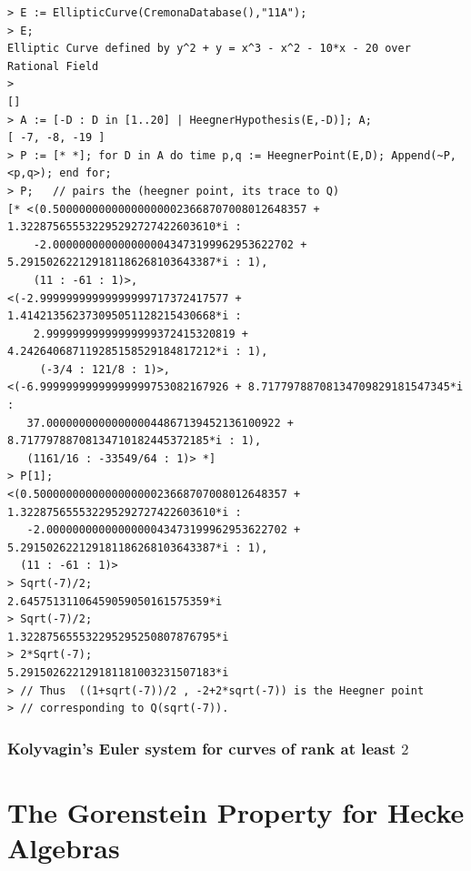 \documentclass{report}
\begin{document}
\begin{verbatim}
> E := EllipticCurve(CremonaDatabase(),"11A");
> E;
Elliptic Curve defined by y^2 + y = x^3 - x^2 - 10*x - 20 over Rational Field
>
[]
> A := [-D : D in [1..20] | HeegnerHypothesis(E,-D)]; A;
[ -7, -8, -19 ]
> P := [* *]; for D in A do time p,q := HeegnerPoint(E,D); Append(~P,<p,q>); end for;
> P;   // pairs the (heegner point, its trace to Q)
[* <(0.500000000000000000023668707008012648357 + 1.322875655532295292727422603610*i :
    -2.0000000000000000043473199962953622702 + 5.291502622129181186268103643387*i : 1),
    (11 : -61 : 1)>,
<(-2.99999999999999999717372417577 + 1.414213562373095051128215430668*i :
    2.99999999999999999372415320819 + 4.242640687119285158529184817212*i : 1),
     (-3/4 : 121/8 : 1)>,
<(-6.99999999999999999753082167926 + 8.71779788708134709829181547345*i :
   37.000000000000000044867139452136100922 + 8.71779788708134710182445372185*i : 1),
   (1161/16 : -33549/64 : 1)> *]
> P[1];
<(0.500000000000000000023668707008012648357 + 1.322875655532295292727422603610*i :
   -2.0000000000000000043473199962953622702 + 5.291502622129181186268103643387*i : 1),
  (11 : -61 : 1)>
> Sqrt(-7)/2;
2.64575131106459059050161575359*i
> Sqrt(-7)/2;
1.322875655532295295250807876795*i
> 2*Sqrt(-7);
5.291502622129181181003231507183*i
> // Thus  ((1+sqrt(-7))/2 , -2+2*sqrt(-7)) is the Heegner point
> // corresponding to Q(sqrt(-7)).
\end{verbatim}

\subsection{Kolyvagin's Euler system for curves of rank at least $2$}


\chapter{The Gorenstein Property for Hecke Algebras}

\end{document}
